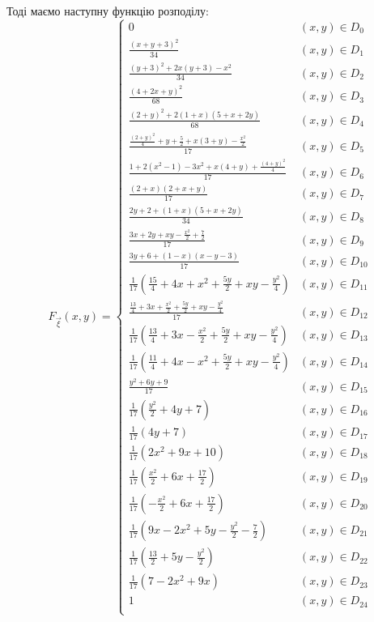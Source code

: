 \documentclass{article}
\begin{document}
	Тоді маємо наступну функцію розподілу:
	\[
	F_{\overrightarrow{\xi}}(x, y) = 
	\begin{cases}
		0 & (x, y) \in D_0 \\
		\frac{(x + y + 3)^2}{34}  & (x, y) \in D_1 \\
		\frac{(y+3)^2 + 2x(y+3) - x^2}{34} & (x, y) \in D_2 \\
		\frac{(4 + 2 x + y)^2}{68} & (x, y) \in D_3 \\
		\frac{(2 + y)^2 + 2(1 + x) (5 + x + 2 y)}{68} & (x, y) \in D_4 \\
		\frac{\frac{(2 + y)^2}{4} + y + \frac{5}{2}  + x (3 + y) - \frac{x^2}{2}}{17} & (x, y) \in D_5 \\
		\frac{1 + 2(x^2-1) - 3 x^2 + x (4 + y) + \frac{(4 + y)^2}{4}}{17} & (x, y) \in D_6 \\
		\frac{(2 + x) (2 + x + y)}{17} & (x, y) \in D_7 \\
		\frac{2y + 2 + {(1 + x) (5 + x + 2 y)}}{34} & (x, y) \in D_8 \\
		\frac{3x + 2y + xy - \frac{x^2}{2} + \frac{7}{2}}{17} & (x, y) \in D_9 \\
		\frac{3y + 6 + (1 - x) (x - y - 3)}{17} & (x, y) \in D_{10} \\
		\frac{1}{17}\left(\frac{15}{4}  + 4x + x^2 + \frac{5y}{2} + x y - \frac{y^2}{4}\right)   & (x, y) \in D_{11} \\
		\frac{\frac{13}{4} + 3 x + \frac{x^2}{2} + \frac{5y}{2} + x y - \frac{y^2}{4}}{17} & (x, y) \in D_{12} \\
		\frac{1}{17}\left(\frac{13}{4} + 3x - \frac{x^2}{2} + \frac{5y}{2} + x y - \frac{y^2}{4}\right) & (x, y) \in D_{13} \\
		\frac{1}{17}\left(\frac{11}{4} + 4 x - x^2 + \frac{5 y}{2} + x y - \frac{y^2}{4}\right) & (x, y) \in D_{14}\\
		\frac{y^2 + 6 y + 9}{17} & (x, y) \in D_{15} \\
		\frac{1}{17}\left(\frac{y^2}{2} + 4y + 7\right) & (x, y) \in D_{16} \\
		\frac{1}{17}\left( 4y + 7\right) & (x, y) \in D_{17} \\
		\frac{1}{17}(2x^2 + 9x + 10) & (x, y) \in D_{18} \\
		\frac{1}{17}(\frac{x^2}{2} + 6x + \frac{17}{2}) & (x, y) \in D_{19} \\
		\frac{1}{17}(-\frac{x^2}{2} + 6x + \frac{17}{2}) & (x, y) \in D_{20} \\
		\frac{1}{17}\left( 9 x - 2 x^2 + 5y - \frac{y^2}{2} -\frac{7}{2} \right)  & (x, y) \in D_{21} \\
		\frac{1}{17}\left( \frac{13}{2} + 5y -\frac{y^2}{2} \right) & (x, y) \in D_{22} \\
		\frac{1}{17}(7 - 2x^2 + 9x)  & (x, y) \in D_{23} \\
		1  & (x, y) \in D_{24} \\
	\end{cases}
	\]
	
\end{document}
